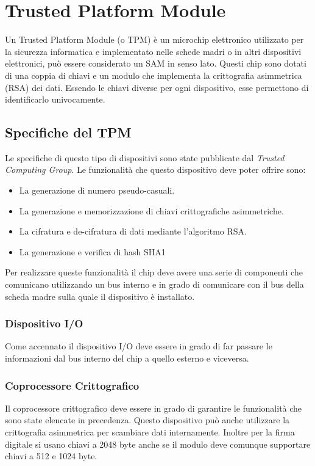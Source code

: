\cite{pos}

\section{Trusted Platform Module}
\label{trusted_platform_module}
Un Trusted Platform Module (o TPM) è un microchip elettronico utilizzato per la sicurezza informatica e implementato nelle schede madri o in altri dispositivi elettronici, può essere considerato un SAM in senso lato. Questi chip sono dotati di una coppia di chiavi e un modulo che implementa la crittografia asimmetrica (RSA) dei dati. Essendo le chiavi diverse per ogni dispositivo, esse permettono di identificarlo univocamente.

\subsection{Specifiche del TPM}
Le specifiche di questo tipo di dispositivi sono state pubblicate dal \textit{Trusted Computing Group}. Le funzionalità che questo dispositivo deve poter offrire sono:
\begin{itemize}
    \item La generazione di numero pseudo-casuali.
    \item La generazione e memorizzazione di chiavi crittografiche asimmetriche.
    \item La cifratura e de-cifratura di dati mediante l'algoritmo RSA.
    \item La generazione e verifica di hash SHA1
\end{itemize}
Per realizzare queste funzionalità il chip deve avere una serie di componenti che comunicano utilizzando un bus interno e in grado di comunicare con il bus della scheda madre sulla quale il dispositivo è installato.

\subsubsection{Dispositivo I/O}
Come accennato il dispositivo I/O deve essere in grado di far passare le informazioni dal bus interno del chip a quello esterno e viceversa.

\subsubsection{Coprocessore Crittografico}
Il coprocessore crittografico deve essere in grado di garantire le funzionalità che sono state elencate in precedenza. Questo dispositivo può anche utilizzare la crittografia asimmetrica per scambiare dati internamente. Inoltre per la firma digitale si usano chiavi a 2048 byte anche se il modulo deve comunque supportare chiavi a 512 e 1024 byte.

